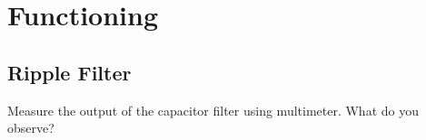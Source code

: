 \documentclass[journal,12pt,twocolumn]{IEEEtran}
\begin{document}
\section{Functioning}
\subsection{Ripple Filter}
\begin{problem}
Measure the output of the capacitor filter using multimeter. What do you observe?
\end{problem}
\end{document}
